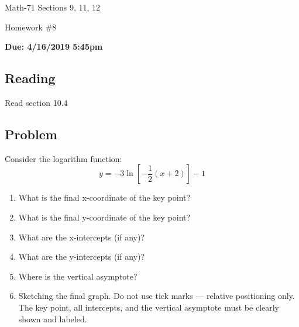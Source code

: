 \documentclass[letterpaper,12pt,fleqn]{article}
\begin{document}
\begin{center}
  \large
  Math-71 Sections 9, 11, 12

  \Large
  Homework \#8

  \large
  \textbf{Due: 4/16/2019 5:45pm}
\end{center}

\subsection*{Reading}

Read section 10.4

\subsection*{Problem}

Consider the logarithm function:
\[y=-3\ln\left[-\frac{1}{2}(x+2)\right]-1\]
\begin{enumerate}[label={\alph*)}]
\item What is the final x-coordinate of the key point?
\item What is the final y-coordinate of the key point?
\item What are the x-intercepts (if any)?
\item What are the y-intercepts (if any)?
\item Where is the vertical asymptote?
\item Sketching the final graph.  Do not use tick marks --- relative positioning only.  The key point, all intercepts, and
  the vertical asymptote must be clearly shown and labeled.
\end{enumerate}
\end{document}
